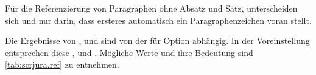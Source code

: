 \begin{Declaration}
\end{Declaration}
Für die Referenzierung von Paragraphen ohne Absatz und Satz, unterscheiden
sich  und  nur darin, dass ersteres
automatisch ein Paragraphenzeichen voran stellt.%
\EndIndexGroup


\begin{Declaration}
\end{Declaration}
Die Ergebnisse von ,
 und  sind
von der  für Option  abhängig. In der
Voreinstellung entsprechen diese
,  und
. Mögliche Werte und ihre Bedeutung sind
\autoref{tab:scrjura.ref} zu entnehmen.%
%
